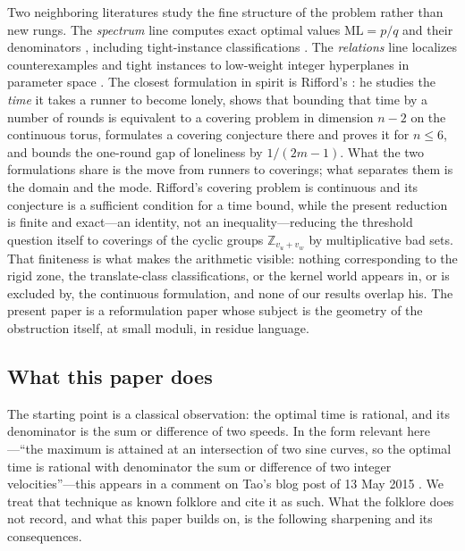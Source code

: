 \documentclass[11pt,a4paper]{article}
\numberwithin{equation}{section}
\theoremstyle{plain}
\theoremstyle{definition}
\theoremstyle{remark}
\newcommand{\Z}{\mathbb{Z}}
\begin{document}
Two neighboring literatures study the fine structure of the problem rather
than new rungs. The \emph{spectrum} line computes exact optimal values
$\mathrm{ML}=p/q$ and their denominators
\cite{Kravitz,FanSun,GiriKravitz,Cordella}, including tight-instance
classifications \cite{Zhang}. The \emph{relations} line localizes
counterexamples and tight instances to low-weight integer hyperplanes in
parameter space \cite{BeckEverett}. The closest formulation in spirit is
Rifford's \cite{Rifford}: he studies the \emph{time} it takes a runner to
become lonely, shows that bounding that time by a number of rounds is
equivalent to a covering problem in dimension $n-2$ on the continuous torus,
formulates a covering conjecture there and proves it for $n\le 6$, and
bounds the one-round gap of loneliness by $1/(2m-1)$. What the two
formulations share is the move from runners to coverings; what separates
them is the domain and the mode. Rifford's covering problem is continuous
and its conjecture is a sufficient condition for a time bound, while the
present reduction is finite and exact---an identity, not an
inequality---reducing the threshold question itself to coverings of the
cyclic groups $\Z_{v_u+v_w}$ by multiplicative bad sets. That finiteness is
what makes the arithmetic visible: nothing corresponding to the rigid zone,
the translate-class classifications, or the kernel world appears in, or is
excluded by, the continuous formulation, and none of our results overlap
his. The present paper is a reformulation paper whose subject is the
geometry of the obstruction itself, at small moduli, in residue language.

\subsection{What this paper does}

The starting point is a classical observation: the optimal time is rational,
and its denominator is the sum or difference of two speeds. In the form
relevant here---``the maximum is attained at an intersection of two sine
curves, so the optimal time is rational with denominator the sum or
difference of two integer velocities''---this appears in a comment on Tao's
blog post of 13 May 2015 \cite{Tao-blog}. We treat that technique as known
folklore and cite it as such. What the folklore does not record, and what
this paper builds on, is the following sharpening and its consequences.
\end{document}
